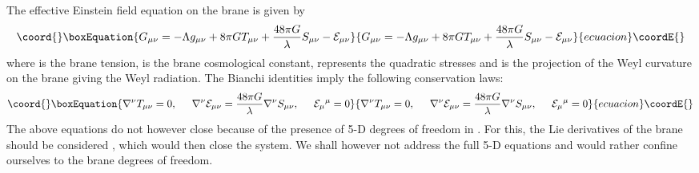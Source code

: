 \documentclass[a4paper,twocolumn,showpacs,preprintnumbers,amsmath,amssymb]{revtex4}
\begin{document}
The effective Einstein field equation on the brane is given by \cite{r2}
\begin{equation}\coord{}\boxEquation{ 
G_{\mu\nu} = -\Lambda g_{\mu\nu} + 8\pi GT_{\mu\nu} + \frac{48\pi G}{\lambda}S_{\mu\nu} - {\cal E}_{\mu\nu}\label{01}}{ 
G_{\mu\nu} = -\Lambda g_{\mu\nu} + 8\pi GT_{\mu\nu} + \frac{48\pi G}{\lambda}S_{\mu\nu} - {\cal E}_{\mu\nu}}{ecuacion}\coordE{}\end{equation}
where \coordHE{} is the brane tension, \myHighlight{$\Lambda$}\coordHE{} is the brane
cosmological constant, \coordHE{} represents the quadratic stresses and
\coordHE{} is the projection of the Weyl curvature on the brane
giving the Weyl radiation. The Bianchi identities imply the following
conservation laws:
\begin{equation}\coord{}\boxEquation{\nabla^{\nu}T_{\mu\nu} = 0, \hspace{5mm} \nabla^{\nu}{\cal E}_{\mu\nu} = \frac{48\pi G}{\lambda}\nabla^{\nu}S_{\mu\nu}
, \hspace{5mm} {\cal E}_{\mu}{}^{\mu} = 0}{\nabla^{\nu}T_{\mu\nu} = 0, \hspace{5mm} \nabla^{\nu}{\cal E}_{\mu\nu} = \frac{48\pi G}{\lambda}\nabla^{\nu}S_{\mu\nu}
, \hspace{5mm} {\cal E}_{\mu}{}^{\mu} = 0}{ecuacion}\coordE{}\end{equation}
The above equations do not however close because of the presence of 5-D
degrees of freedom in \coordHE{}. For this, the Lie derivatives of
the brane should be considered \cite{r2}, which would then close the system. We
shall however not address the full 5-D equations and would rather
confine ourselves to the brane degrees of freedom.
\end{document}
